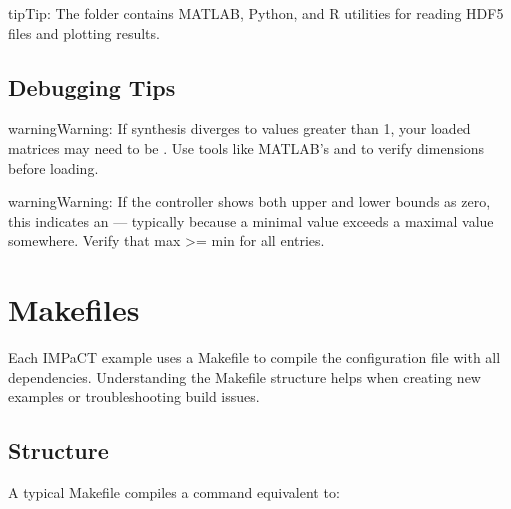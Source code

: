 \documentclass[a4paper,10pt,english]{sphinxmanual}
\begin{document}
\begin{sphinxadmonition}{tip}{Tip:}
\sphinxAtStartPar
The  folder contains MATLAB, Python, and R utilities for reading
HDF5 files and plotting results.
\end{sphinxadmonition}


\subsection{Debugging Tips}
\label{\detokenize{user-guide/io:debugging-tips}}
\begin{sphinxadmonition}{warning}{Warning:}
\sphinxAtStartPar
If synthesis diverges to values greater than 1, your loaded matrices may need
to be . Use tools like MATLAB’s  and  to
verify dimensions before loading.
\end{sphinxadmonition}

\begin{sphinxadmonition}{warning}{Warning:}
\sphinxAtStartPar
If the controller shows both upper and lower bounds as zero, this indicates an
 — typically because a minimal value exceeds a maximal
value somewhere. Verify that max \textgreater{}= min for all entries.
\end{sphinxadmonition}

\sphinxstepscope


\section{Makefiles}
\label{\detokenize{user-guide/makefiles:makefiles}}\label{\detokenize{user-guide/makefiles::doc}}
\sphinxAtStartPar
Each IMPaCT example uses a Makefile to compile the configuration file with all
dependencies. Understanding the Makefile structure helps when creating new examples
or troubleshooting build issues.


\subsection{Structure}
\label{\detokenize{user-guide/makefiles:structure}}
\sphinxAtStartPar
A typical Makefile compiles a command equivalent to:
\end{document}
